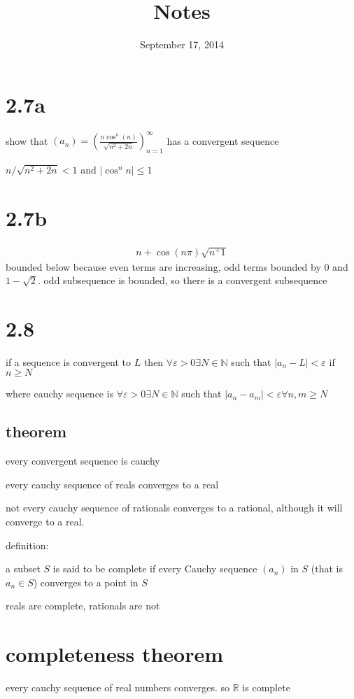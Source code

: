 \documentclass[letterpaper]{article}
\begin{document}
\title{Notes}
\date{September 17, 2014}
\maketitle
\section*{2.7a}
show that $(a_n)=\left(\frac{n\cos^n(n)}{\sqrt{n^2+2n}}\right)_{n=1}^\infty$ has a convergent sequence

$n/\sqrt{n^2+2n}<1$ and $\left\lvert\cos^nn\right\rvert\le1$
\section*{2.7b}
\begin{align*}
  n+\cos(n\pi)\sqrt{n^+1}
\end{align*}
bounded below because even terms are increasing, odd terms bounded by 0 and $1-\sqrt{2}$. odd subsequence is bounded, so there is a convergent subsequence

\section*{2.8}
if a sequence is convergent to $L$ then $\forall\varepsilon>0\exists N\in\mathbb{N}$ such that $\left\lvert a_n-L\right\rvert<\varepsilon$ if $n\ge N$

where cauchy sequence is $\forall\varepsilon>0\exists N\in\mathbb{N}$ such that $\left\lvert a_n-a_m\right\rvert<\varepsilon\forall n,m\ge N$

\subsection*{theorem}
every convergent sequence is cauchy

every cauchy sequence of reals converges to a real

not every cauchy sequence of rationals converges to a rational, although it will converge to a real.

definition:

a subset $S$ is said to be complete if every Cauchy sequence $(a_n)$ in $S$ (that is $a_n\in S$) converges to a point in $S$

reals are complete, rationals are not

\section*{completeness theorem}
every cauchy sequence of real numbers converges. so $\mathbb{R}$ is complete
\end{document}

